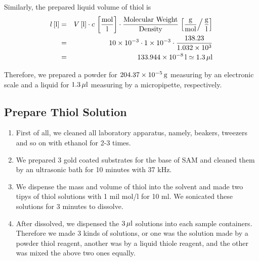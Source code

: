 Similarly, the prepared liquid volume of thiol is
\begin{eqnarray}
 l\, [{\rm l}] &=& V \, [{\rm l}] \cdot c \, \left[ \frac{{{\rm mol}}}{\rm l}\right] \cdot 
\frac{\rm Molecular \ Weight}{\rm Density} \left.  \left[ \frac{\rm g}{{\rm mol} }\right/\frac{\rm g}{\rm l}\right] \nonumber \\
& =& 10\times 10^{-3}\cdot 1\times 10^{-3} \cdot  \frac{138.23}{1.032\times 10^{3}} \nonumber \\
&=& 133.944 \times 10^{-8} \, {\rm l} \simeq 1.3 \, \mu \rm l
\end{eqnarray}

Therefore, we prepared a powder for $204.37 \times 10^{-5} \, \rm g$ measuring by an electronic scale and a liquid for $1.3 \, \mu  \rm l$ measuring by a micropipette, respectively.



\subsection{Prepare Thiol Solution}
\begin{enumerate}
 \item First of all, we cleaned all laboratory apparatus, namely, beakers, tweezers and so on with ethanol for 2-3 times.


 \item We prepared 3 gold coated substrates for the base of SAM and cleaned them by an ultrasonic bath for 10 minutes with 37 kHz.
 \item We dispense the mass and volume of thiol into the solvent and made two tipys of thiol solutions with 1 mil mol/l for 10 ml. We sonicated these solutions for 3 minutes to dissolve.
 \item After dissolved, we dispensed the $3 \, \mu \rm l$ solutions into each sample containers. Therefore we made 3 kinds of solutions, or one was the solution made by a powder thiol reagent, another was by a liquid thiole reagent, and the other was mixed the above two ones equally. 
\end{enumerate}
